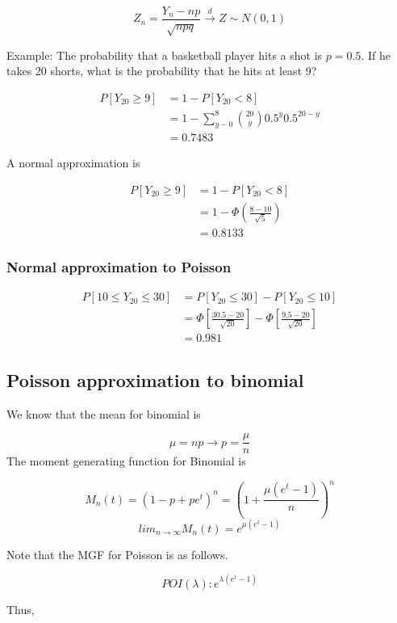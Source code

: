 \documentclass[]{book}
\begin{document}
\[Z_n=\frac{Y_n-np}{\sqrt{npq}} \xrightarrow{d} Z \sim N(0, 1)\]

Example: The probability that a basketball player hits a shot is \(p=0.5\). If he takes 20 shorts, what is the probability that he hits at least 9?

\[\begin{aligned} P[Y_{20} \geq 9] &=1-P[Y_{20} < 8] \\ &=1- \sum_{y-0}^8 \binom{20}{y} 0.5^y0.5^{20-y} \\&=0.7483 \end{aligned} \]

A normal approximation is

\[\begin{aligned} P[Y_{20} \geq 9] &=1-P[Y_{20}<8] \\ &=1- \Phi(\frac{8-10}{\sqrt{5}}) \\&=0.8133 \end{aligned} \]

\hypertarget{normal-approximation-to-poisson}{%
\subsubsection{Normal approximation to Poisson}\label{normal-approximation-to-poisson}}

\[\begin{aligned} P[10\leq Y_{20} \leq 30] &=P[ Y_{20} \leq 30]-P[ Y_{20} \leq 10] \\&=\Phi[\frac{30.5-20}{\sqrt{20}}]-\Phi[\frac{9.5-20}{\sqrt{20}}] \\ &=0.981 \end{aligned}\]

\hypertarget{poisson-approximation-to-binomial}{%
\subsection{Poisson approximation to binomial}\label{poisson-approximation-to-binomial}}

We know that the mean for binomial is

\[\mu=np \rightarrow p=\frac{\mu}{n}\]
The moment generating function for Binomial is

\[M_n(t)=(1-p+pe^t)^n=(1+\frac{\mu (e^t-1)}{n})^n\]
\[lim_{n \rightarrow \infty} M_n(t)=e^{\mu (e^t-1)}\]

Note that the MGF for Poisson is as follows.

\[POI(\lambda): e^{\lambda(e^t-1)}\]

Thus,
\end{document}

